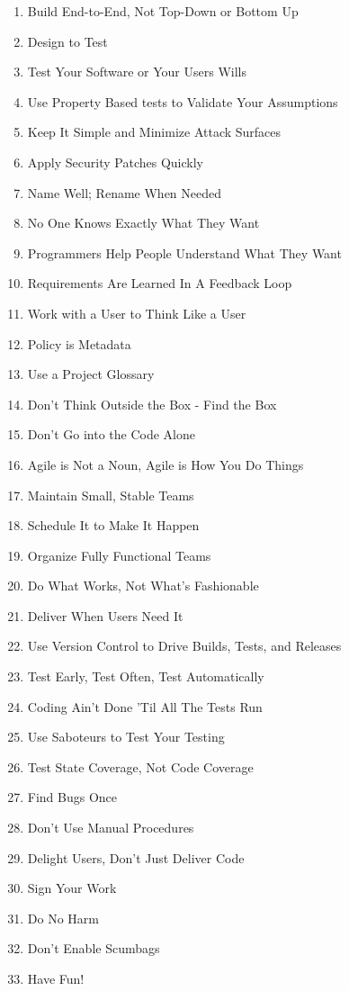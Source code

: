 \documentclass{article}
\begin{document}
\begin{enumerate}
    \item Build End-to-End, Not Top-Down or Bottom Up
    \item Design to Test
    \item Test Your Software or Your Users Wills
    \item Use Property Based tests to Validate Your Assumptions
    \item Keep It Simple and Minimize Attack Surfaces
    \item Apply Security Patches Quickly
    \item Name Well; Rename When Needed
    \item No One Knows Exactly What They Want
    \item Programmers Help People Understand What They Want
    \item Requirements Are Learned In A Feedback Loop
    \item Work with a User to Think Like a User
    \item Policy is Metadata
    \item Use a Project Glossary
    \item Don't Think Outside the Box - Find the Box
    \item Don't Go into the Code Alone
    \item Agile is Not a Noun, Agile is How You Do Things
    \item Maintain Small, Stable Teams
    \item Schedule It to Make It Happen
    \item Organize Fully Functional Teams
    \item Do What Works, Not What's Fashionable
    \item Deliver When Users Need It
    \item Use Version Control to Drive Builds, Tests, and Releases
    \item Test Early, Test Often, Test Automatically
    \item Coding Ain't Done 'Til All The Tests Run
    \item Use Saboteurs to Test Your Testing
    \item Test State Coverage, Not Code Coverage
    \item Find Bugs Once
    \item Don't Use Manual Procedures
    \item Delight Users, Don't Just Deliver Code
    \item Sign Your Work
    \item Do No Harm
    \item Don't Enable Scumbags
    \item Have Fun!
\end{enumerate}
\end{document}
